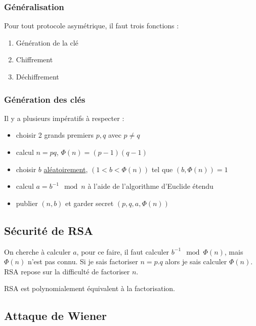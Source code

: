 \documentclass[a4paper, 10pt]{thesis}
\begin{document}
\subsubsection{Généralisation}

Pour tout protocole asymétrique, il faut trois fonctions :
\begin{enumerate}
    \item Génération de la clé
    \item Chiffrement
    \item Déchiffrement
\end{enumerate}


\subsubsection{Génération des clés}

Il y a plusieurs impératifs à respecter :
\begin{itemize}
    \item choisir 2 grands premiers $p, q$ avec $p \neq q$
    \item calcul $n = pq$, $\Phi(n) = (p - 1)(q - 1)$
    \item choisir $b$ \underline{aléatoirement}, $(1 < b < \Phi(n))$ tel que $(b, \Phi(n)) = 1$
    \item calcul $a = b^{-1} \mod n$ à l'aide de l'algorithme d'Euclide étendu
    \item publier $(n, b)$ et garder secret $(p, q, a, \Phi(n))$
\end{itemize}

\subsection{Sécurité de RSA}

On cherche à calculer $a$, pour ce faire, il faut calculer $b^{-1} \mod \Phi(n)$, mais $\Phi(n)$
n'est pas connu. Si je sais factoriser $n = p.q$ alors je sais calculer $\Phi(n)$. RSA repose sur la
difficulté de factoriser $n$.

\begin{conj}
    RSA est polynomialement équivalent à la factorisation.
\end{conj}

\subsection{Attaque de Wiener}
\end{document}
